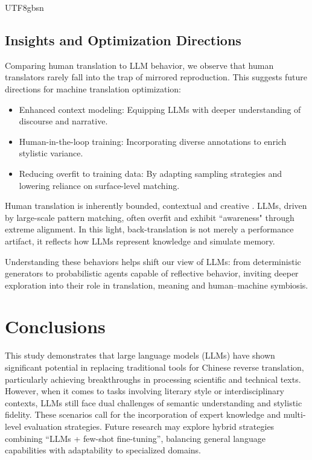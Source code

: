\documentclass[conference]{IEEEtran}
\begin{document}
\begin{CJK}{UTF8}{gbsn}
\subsection{Insights and Optimization Directions}
Comparing human translation to LLM behavior, we observe that human translators rarely fall into the trap of mirrored reproduction. This suggests future directions for machine translation optimization:

\begin{itemize}
  \item Enhanced context modeling: Equipping LLMs with deeper understanding of discourse and narrative.
  \item Human-in-the-loop training: Incorporating diverse annotations to enrich stylistic variance.
  \item Reducing overfit to training data: By adapting sampling strategies and lowering reliance on surface-level matching.
\end{itemize}

Human translation is inherently bounded, contextual and creative \citep{wang2009translation}. LLMs, driven by large-scale pattern matching, often overfit and exhibit ``awareness" through extreme alignment. In this light, back-translation is not merely a performance artifact, it reflects how LLMs represent knowledge and simulate memory.

Understanding these behaviors helps shift our view of LLMs: from deterministic generators to probabilistic agents capable of reflective behavior, inviting deeper exploration into their role in translation, meaning and human–machine symbiosis.

\section{Conclusions}
This study demonstrates that large language models (LLMs) have shown significant potential in replacing traditional tools for Chinese reverse translation, particularly achieving breakthroughs in processing scientific and technical texts. However, when it comes to tasks involving literary style or interdisciplinary contexts, LLMs still face dual challenges of semantic understanding and stylistic fidelity. These scenarios call for the incorporation of expert knowledge and multi-level evaluation strategies. Future research may explore hybrid strategies combining ``LLMs + few-shot fine-tuning'', balancing general language capabilities with adaptability to specialized domains.


\end{CJK}
\end{document}

